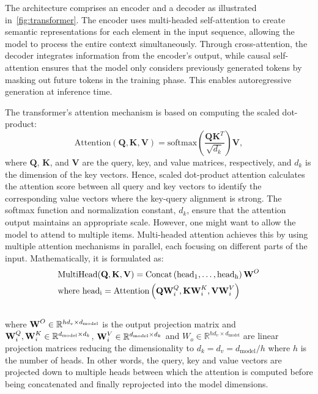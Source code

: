 The architecture comprises an encoder and a decoder as illustrated in~\cref{fig:transformer}. The encoder uses multi-headed self-attention to create semantic representations for each element in the input sequence, allowing the model to process the entire context simultaneously. Through cross-attention, the decoder integrates information from the encoder's output, while causal self-attention ensures that the model only considers previously generated tokens by masking out future tokens in the training phase. This enables autoregressive generation at inference time. 

The transformer's attention mechanism is based on computing the scaled dot-product: 
\begin{equation}
    \text{Attention}(\mathbf{Q}, \mathbf{K}, \mathbf{V}) = \text{softmax}\left(\frac{\mathbf{Q} \mathbf{K}^T}{\sqrt{d_k}} \right) \mathbf{V},
\end{equation}
where $\mathbf{Q}$, $\mathbf{K}$, and $\mathbf{V}$ are the query, key, and value matrices, respectively, and $d_k$ is the dimension of the key vectors. Hence, scaled dot-product attention calculates the attention score between all query and key vectors to identify the corresponding value vectors where the key-query alignment is strong. The softmax function and normalization constant, $d_k$, ensure that the attention output maintains an appropriate scale. However, one might want to allow the model to attend to multiple items. Multi-headed attention achieves this by using multiple attention mechanisms in parallel, each focusing on different parts of the input. Mathematically, it is formulated as:
\begin{equation}
    \begin{aligned}
        & \text{MultiHead}(\boldsymbol{\mathbf{Q}}, \boldsymbol{\mathbf{K}}, \boldsymbol{\mathbf{V}})=\operatorname{Concat}\left(\text{head}_1, \ldots, \text{head}_{\mathrm{h}}\right) \boldsymbol{\mathbf{W}}^O \\
        & \text {where head}_{\mathrm{i}}=\operatorname{Attention}\left(\boldsymbol{\mathbf{Q}} \boldsymbol{\mathbf{W}}_i^Q, \boldsymbol{\mathbf{K}} \boldsymbol{\mathbf{W}}_i^K, \boldsymbol{\mathbf{V}} \boldsymbol{\mathbf{W}}_i^V\right) \\
        &
    \end{aligned}
\end{equation}
where $\boldsymbol{\mathbf{W}}^O \in \mathbb{R}^{h d_v \times d_\text{model}}$ is the output projection matrix and $\boldsymbol{\mathbf{W}}_i^Q, \boldsymbol{\mathbf{W}}_i^K \in \mathbb{R}^{d_\text{model} \times d_k}$, $\boldsymbol{\mathbf{W}}_i^V \in \mathbb{R}^{d_\text{model} \times d_k}$ and $W_o \in \mathbb{R}^{h d_v \times d_\text{model}}$ are linear projection matrices reducing the dimensionality to $d_k = d_v = d_\text{model} / h$ where $h$ is the number of heads. In other words, the query, key and value vectors are projected down to multiple heads between which the attention is computed before being concatenated and finally reprojected into the model dimensions. 

